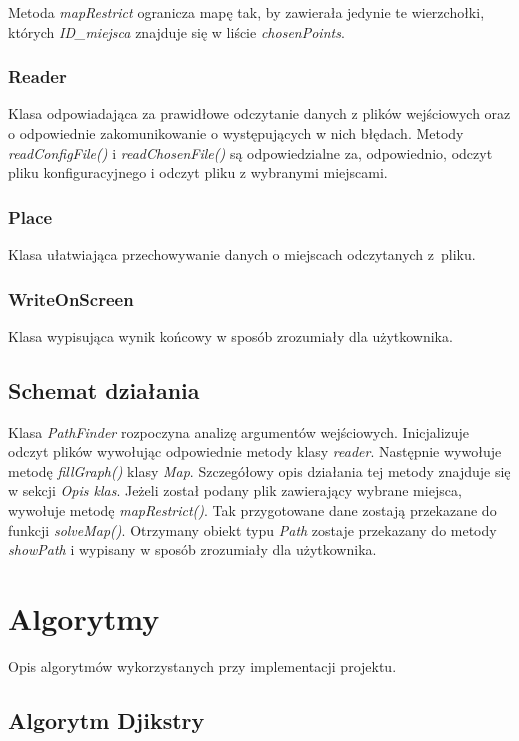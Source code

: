 \documentclass{article}
\begin{document}
Metoda \textit{mapRestrict} ogranicza mapę tak, by zawierała jedynie te wierzchołki, których \textit{ID\_miejsca} znajduje się w liście \textit{chosenPoints}.

\subsubsection{Reader}
Klasa odpowiadająca za prawidłowe odczytanie danych z plików wejściowych oraz o odpowiednie zakomunikowanie o występujących w nich błędach. Metody \textit{readConfigFile()} i \textit{readChosenFile()} są odpowiedzialne za, odpowiednio, odczyt pliku konfiguracyjnego i odczyt pliku z wybranymi miejscami.

\subsubsection{Place}
Klasa ułatwiająca przechowywanie danych o miejscach odczytanych z~pliku.

\subsubsection{WriteOnScreen}
Klasa wypisująca wynik końcowy w sposób zrozumiały dla użytkownika.

\subsection{Schemat działania}
Klasa \textit{PathFinder} rozpoczyna analizę argumentów wejściowych. Inicjalizuje odczyt plików wywołując odpowiednie metody klasy \textit{reader}. Następnie wywołuje metodę \textit{fillGraph()} klasy \textit{Map}. Szczegółowy opis działania tej metody znajduje się w sekcji \textit{Opis klas}. Jeżeli został podany plik zawierający wybrane miejsca, wywołuje metodę \textit{mapRestrict()}. Tak przygotowane dane zostają przekazane do funkcji \textit{solveMap()}. Otrzymany obiekt typu \textit{Path} zostaje przekazany do metody \textit{showPath} i wypisany w sposób zrozumiały dla użytkownika.

\section{Algorytmy}
Opis algorytmów wykorzystanych przy implementacji projektu.

\subsection{Algorytm Djikstry}
\end{document}
